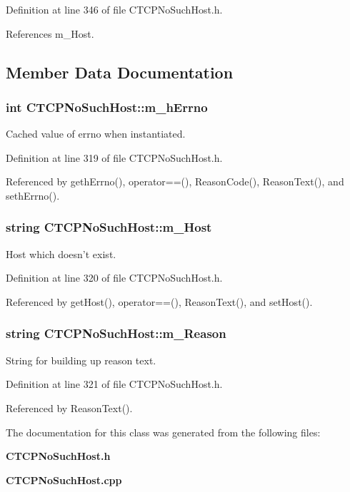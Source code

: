 Definition at line 346 of file CTCPNo\-Such\-Host.h.

References m\_\-Host.

\subsection{Member Data Documentation}
\subsubsection{\setlength{\rightskip}{0pt plus 5cm}int CTCPNo\-Such\-Host::m\_\-h\-Errno\hspace{0.3cm}{\tt  [private]}}\label{classCTCPNoSuchHost_o0}


Cached value of errno when instantiated.



Definition at line 319 of file CTCPNo\-Such\-Host.h.

Referenced by geth\-Errno(), operator==(), Reason\-Code(), Reason\-Text(), and seth\-Errno().
\subsubsection{\setlength{\rightskip}{0pt plus 5cm}string CTCPNo\-Such\-Host::m\_\-Host\hspace{0.3cm}{\tt  [private]}}\label{classCTCPNoSuchHost_o1}


Host which doesn't exist.



Definition at line 320 of file CTCPNo\-Such\-Host.h.

Referenced by get\-Host(), operator==(), Reason\-Text(), and set\-Host().
\subsubsection{\setlength{\rightskip}{0pt plus 5cm}string CTCPNo\-Such\-Host::m\_\-Reason\hspace{0.3cm}{\tt  [private]}}\label{classCTCPNoSuchHost_o2}


String for building up reason text.



Definition at line 321 of file CTCPNo\-Such\-Host.h.

Referenced by Reason\-Text().

The documentation for this class was generated from the following files:\begin{CompactItemize}
\item 
{\bf CTCPNo\-Such\-Host.h}\item 
{\bf CTCPNo\-Such\-Host.cpp}\end{CompactItemize}
